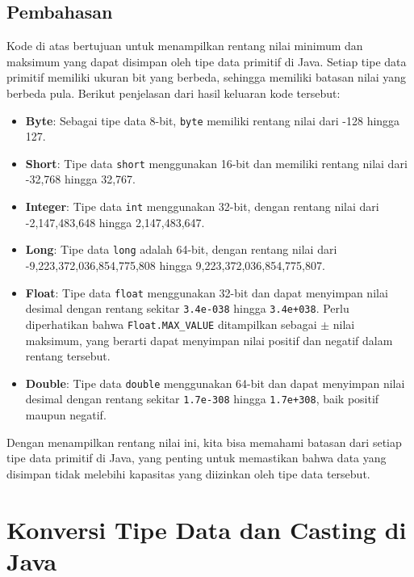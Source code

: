 \subsection{Pembahasan}
Kode di atas bertujuan untuk menampilkan rentang nilai minimum dan maksimum yang dapat disimpan oleh tipe data primitif di Java. Setiap tipe data primitif memiliki ukuran bit yang berbeda, sehingga memiliki batasan nilai yang berbeda pula. Berikut penjelasan dari hasil keluaran kode tersebut:

\begin{itemize}
	\item \textbf{Byte}: Sebagai tipe data 8-bit, \texttt{byte} memiliki rentang nilai dari -128 hingga 127.
	\item \textbf{Short}: Tipe data \texttt{short} menggunakan 16-bit dan memiliki rentang nilai dari -32,768 hingga 32,767.
	\item \textbf{Integer}: Tipe data \texttt{int} menggunakan 32-bit, dengan rentang nilai dari -2,147,483,648 hingga 2,147,483,647.
	\item \textbf{Long}: Tipe data \texttt{long} adalah 64-bit, dengan rentang nilai dari -9,223,372,036,854,775,808 hingga 9,223,372,036,854,775,807.
	\item \textbf{Float}: Tipe data \texttt{float} menggunakan 32-bit dan dapat menyimpan nilai desimal dengan rentang sekitar \texttt{3.4e-038} hingga \texttt{3.4e+038}. Perlu diperhatikan bahwa \texttt{Float.MAX\_VALUE} ditampilkan sebagai $\pm$ nilai maksimum, yang berarti dapat menyimpan nilai positif dan negatif dalam rentang tersebut.
	\item \textbf{Double}: Tipe data \texttt{double} menggunakan 64-bit dan dapat menyimpan nilai desimal dengan rentang sekitar \texttt{1.7e-308} hingga \texttt{1.7e+308}, baik positif maupun negatif.
\end{itemize}

Dengan menampilkan rentang nilai ini, kita bisa memahami batasan dari setiap tipe data primitif di Java, yang penting untuk memastikan bahwa data yang disimpan tidak melebihi kapasitas yang diizinkan oleh tipe data tersebut.

\section{Konversi Tipe Data dan Casting di Java}

